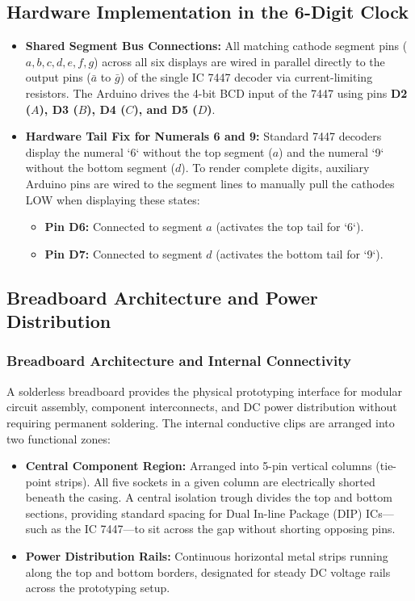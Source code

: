 \documentclass[journal,12pt,onecolumn]{IEEEtran}
\begin{document}
		\subsection{Hardware Implementation in the 6-Digit Clock}
		\begin{itemize}
			\item \textbf{Shared Segment Bus Connections:} All matching cathode segment pins ($a, b, c, d, e, f, g$) across all six displays are wired in parallel directly to the output pins ($\bar{a}$ to $\bar{g}$) of the single IC 7447 decoder via current-limiting resistors. The Arduino drives the 4-bit BCD input of the 7447 using pins \textbf{D2 ($A$), D3 ($B$), D4 ($C$), and D5 ($D$)}.
			
			\item \textbf{Hardware Tail Fix for Numerals 6 and 9:} Standard 7447 decoders display the numeral `6` without the top segment ($a$) and the numeral `9` without the bottom segment ($d$). To render complete digits, auxiliary Arduino pins are wired to the segment lines to manually pull the cathodes LOW when displaying these states:
			\begin{itemize}
				\item \textbf{Pin D6:} Connected to segment \textbf{$a$} (activates the top tail for `6`).
				\item \textbf{Pin D7:} Connected to segment \textbf{$d$} (activates the bottom tail for `9`).
			\end{itemize}
		\end{itemize}
		
		\newpage
		\subsection{Breadboard Architecture and Power Distribution}
		
		\subsubsection{Breadboard Architecture and Internal Connectivity}
		A solderless breadboard provides the physical prototyping interface for modular circuit assembly, component interconnects, and DC power distribution without requiring permanent soldering. The internal conductive clips are arranged into two functional zones:
		\begin{itemize}
			\item \textbf{Central Component Region:} Arranged into 5-pin vertical columns (tie-point strips). All five sockets in a given column are electrically shorted beneath the casing. A central isolation trough divides the top and bottom sections, providing standard spacing for Dual In-line Package (DIP) ICs---such as the IC 7447---to sit across the gap without shorting opposing pins.
			\item \textbf{Power Distribution Rails:} Continuous horizontal metal strips running along the top and bottom borders, designated for steady DC voltage rails across the prototyping setup.
		\end{itemize}
		
\end{document}
